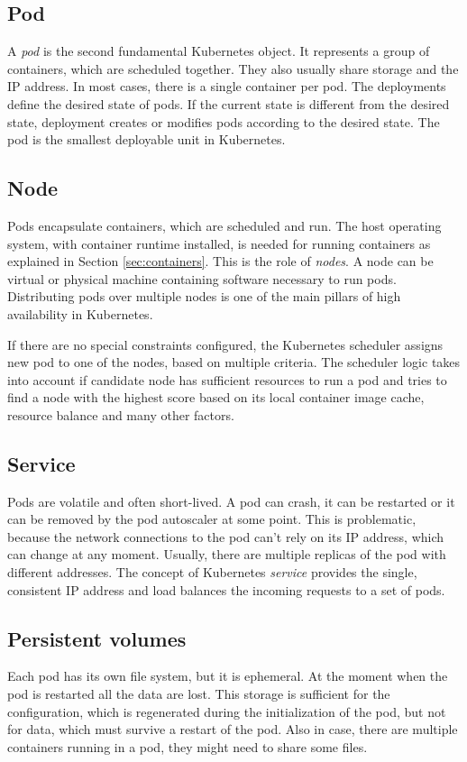 \documentclass[
  digital, %
  twoside, %
  table,   %
  nolof,   %
  nolot,   %
]{fithesis3}
\begin{document}
\subsection{Pod} \label{sec:pod}
A \textit{pod} is the second fundamental Kubernetes object. It represents a group of containers, which are scheduled together. They also usually share storage and the IP address. In most cases, there is a single container per pod. The deployments define the desired state of pods. If the current state is different from the desired state, deployment creates or modifies pods according to the desired state. The pod is the smallest deployable unit in Kubernetes.

\subsection{Node} \label{sec:node}
Pods encapsulate containers, which are scheduled and run. The host operating system, with container runtime installed, is needed for running containers as explained in Section \ref{sec:containers}. This is the role of \textit{nodes}. A node can be virtual or physical machine containing software necessary to run pods. Distributing pods over multiple nodes is one of the main pillars of high availability in Kubernetes.

If there are no special constraints configured, the Kubernetes scheduler \cite{kube-scheduler} assigns new pod to one of the nodes, based on multiple criteria. The scheduler logic takes into account if candidate node has sufficient resources to run a pod and tries to find a node with the highest score based on its local container image cache, resource balance and many other factors.

\subsection{Service} \label{sec:service}
Pods are volatile and often short-lived. A pod can crash, it can be restarted or it can be removed by the pod autoscaler \cite{hpa} at some point. This is problematic, because the network connections to the pod can't rely on its IP address, which can change at any moment. Usually, there are multiple replicas of the pod with different addresses. The concept of Kubernetes \textit{service} provides the single, consistent IP address and load balances the incoming requests to a set of pods.

\subsection{Persistent volumes} \label{sec:pv}
Each pod has its own file system, but it is ephemeral. At the moment when the pod is restarted all the data are lost. This storage is sufficient for the configuration, which is regenerated during the initialization of the pod, but not for data, which must survive a restart of the pod. Also in case, there are multiple containers running in a pod, they might need to share some files.
\end{document}

